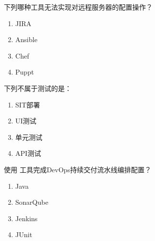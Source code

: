 \begin{problem}
	下列哪种工具无法实现对远程服务器的配置操作？
    \vspace{-0.8em}
    \begin{multicols}{4}
        \begin{enumerate}[label=\Alph*.]
            \item JIRA
            \item Ansible
            \item Chef
            \item Puppt
        \end{enumerate}
    \end{multicols}
    \vspace{-1em}
\end{problem}


\begin{problem}
	​下列不属于测试的是：
    \vspace{-0.8em}
    \begin{multicols}{4}
        \begin{enumerate}[label=\Alph*.]
            \item SIT部署
            \item UI测试
            \item 单元测试
            \item API测试
        \end{enumerate}
    \end{multicols}
    \vspace{-1em}
\end{problem}


\begin{problem}
	使用 \underline{\qquad \qquad} 工具完成DevOps持续交付流水线编排配置？
    \vspace{-0.8em}
    \begin{multicols}{4}
        \begin{enumerate}[label=\Alph*.]
            \item Java
            \item SonarQube
            \item Jenkins
            \item JUnit
        \end{enumerate}
    \end{multicols}
    \vspace{-1em}
\end{problem}


